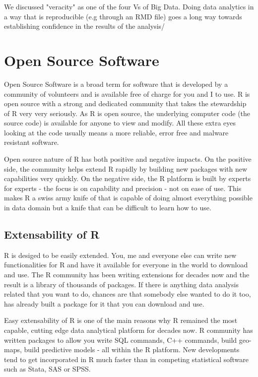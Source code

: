 \documentclass[10pt, letterpaper, twoside]{memoir}\usepackage{knitr}
\begin{document}
We discussed "veracity" as one of the four Vs of Big Data. Doing data analytics in a way that is reproducible (e.g through an RMD file) goes a long way towards establishing confidence in the results of the analysis/

\section{Open Source Software}

Open Source Software is a broad term for software that is developed by a community of volunteers and is available free of charge for you and I to use. R is open source with a strong and dedicated community that takes the stewardship of R very very seriously. 
As R is open source, the underlying computer code (the source code) is available for anyone to view and modify. All these extra eyes looking at the code usually means a more reliable, error free and malware resistant software. 

Open source nature of R has both positive and negative impacts. On the positive side, the community helps extend R rapidly by building new packages with new capabilities very quickly. On the negative side, the R platform is built by experts for experts - the focus is on capability and precision - not on ease of use. This makes R a swiss army knife of that is capable of doing almost everything possible in data domain but a knife that can be difficult to learn how to use.

\subsection{Extensability of R}

R is desiged to be easily extended. You, me and everyone else can write new functionalities for R and have it available for everyone in the world to download and use. The R community has been writing extensions for decades now and the result is a library of thousands of packages. If there is anything data analysis related that you want to do, chances are that somebody else wanted to do it too, has already built a package for it that you can download and use. 

Easy extensability of R is one of the main reasons why R remained the most capable, cutting edge data analytical platform for decades now. R community has written packages to allow you write SQL commands, C++ commands, build geo-maps, build predictive models - all within the R platform. New developments tend to get incorporated in R much faster than in competing statistical software such as Stata, SAS or SPSS.     
\end{document}

